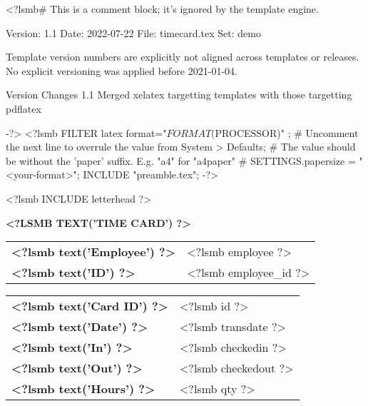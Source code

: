 <?lsmb#   This is a comment block; it's ignored by the template engine.

   Version:  1.1
   Date:     2022-07-22
   File:     timecard.tex
   Set:      demo

Template version numbers are explicitly not aligned across templates or
releases. No explicit versioning was applied before 2021-01-04.

Version   Changes
1.1       Merged xelatex targetting templates with those targetting pdflatex

-?>
<?lsmb FILTER latex { format="$FORMAT($PROCESSOR)" };
       # Uncomment the next line to overrule the value from System > Defaults;
       # The value should be without the 'paper' suffix. E.g. "a4" for "a4paper"
       # SETTINGS.papersize = "<your-format>";
       INCLUDE "preamble.tex"; -?>



\pagestyle{myheadings}
\thispagestyle{empty}

\ifpdftex
  \fontsize{10pt}{12pt}\selectfont
\fi

<?lsmb INCLUDE letterhead ?>

\centerline{\textbf{\MakeUppercase{<?lsmb text('Time Card') ?>}}}

\vspace*{0.5cm}

\begin{tabular}[t]{ll}
  \textbf{<?lsmb text('Employee') ?>} & <?lsmb employee ?> \\
  \textbf{<?lsmb text('ID') ?>} & <?lsmb employee_id ?> \\
\end{tabular}
\hfill
\begin{tabular}[t]{ll}
  \textbf{<?lsmb text('Card ID') ?>} & <?lsmb id ?> \\
  \textbf{<?lsmb text('Date') ?>} & <?lsmb transdate ?> \\
  \textbf{<?lsmb text('In') ?>} & <?lsmb checkedin ?> \\
  \textbf{<?lsmb text('Out') ?>} & <?lsmb checkedout ?> \\
  \textbf{<?lsmb text('Hours') ?>} & <?lsmb qty ?> \\
\end{tabular}

\vspace{1cm}

